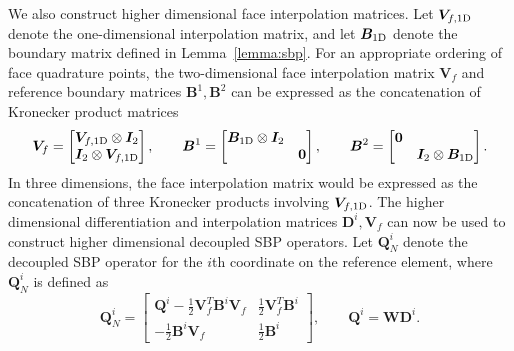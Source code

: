 \documentclass[review,onefignum,onetabnum,final]{siamart171218}
\begin{document}
We also construct higher dimensional face interpolation matrices.  Let $\bm{V}_{f, {\rm 1D}}$ denote the one-dimensional interpolation matrix, and let $\bm{B}_{\rm 1D}$ denote the boundary matrix defined in Lemma~\ref{lemma:sbp}.  For an appropriate ordering of face quadrature points, the two-dimensional face interpolation matrix $\bm{V}_f$ and reference boundary matrices ${\bm{B}}^1, {\bm{B}}^2$ can be expressed as the concatenation of Kronecker product matrices
\[
\bm{V}_f = \begin{bmatrix}
\bm{V}_{f, {\rm 1D}} \otimes \bm{I}_{2}\\
\bm{I}_{2} \otimes \bm{V}_{f, {\rm 1D}} 
\end{bmatrix}, \qquad 
{\bm{B}}^1 = \begin{bmatrix}
\bm{B}_{\rm 1D} \otimes \bm{I}_{2} & \\
& \bm{0}
\end{bmatrix}, \qquad 
{\bm{B}}^2 = \begin{bmatrix}
\bm{0} &\\
& \bm{I}_{2} \otimes \bm{B}_{\rm 1D} 
\end{bmatrix}.
\]
In three dimensions, the face interpolation matrix would be expressed as the concatenation of three Kronecker products involving $\bm{V}_{f, {\rm 1D}}$.  The higher dimensional differentiation and interpolation matrices $\bm{D}^i, \bm{V}_f$ can now be used to construct higher dimensional decoupled SBP operators.  Let ${\bm{Q}}^i_N$ denote the decoupled SBP operator for the $i$th coordinate on the reference element, where ${\bm{Q}}^i_N$ is defined as
\[
{\bm{Q}}^i_N = \begin{bmatrix}
{\bm{Q}}^i - \frac{1}{2}\bm{V}_f^T{\bm{B}}^i\bm{V}_f & \frac{1}{2}\bm{V}_f^T{\bm{B}}^i\\
-\frac{1}{2}{\bm{B}}^i\bm{V}_f & \frac{1}{2}{\bm{B}}^i
\end{bmatrix}, \qquad {\bm{Q}}^i = {\bm{W}}{\bm{D}}^i.
\]
\end{document}
